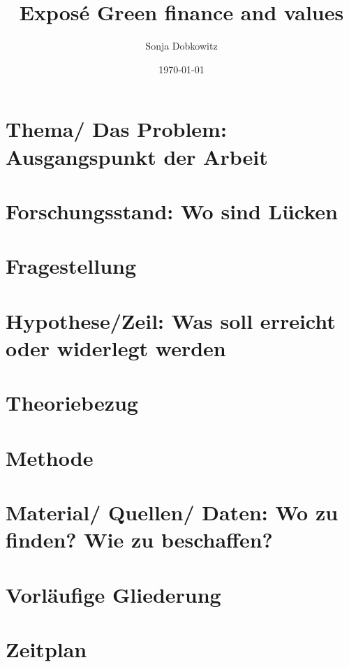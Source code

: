 \documentclass{article}
\title{Exposé Green finance and values}
\author{Sonja Dobkowitz}
\date{\today}
\begin{document}
\maketitle
\section{Thema/ Das Problem: Ausgangspunkt der Arbeit}
\section{Forschungsstand: Wo sind Lücken}
\section{Fragestellung}
\section{Hypothese/Zeil: Was soll erreicht oder widerlegt werden}
\section{Theoriebezug}
\section{Methode}
\section{Material/ Quellen/ Daten: Wo zu finden? Wie zu beschaffen?}
\section{Vorläufige Gliederung}
\section{Zeitplan}
\end{document}
